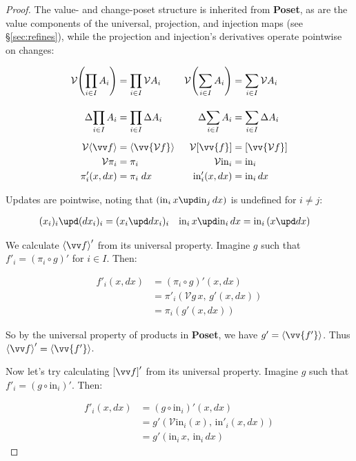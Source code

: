 \documentclass[nomarginums]{rntz}
\newcommand\cat\textbf
\newcommand\Poset{\cat{Poset}}
\newcommand\D\Delta
\newcommand\injc{\mathrm{in}}
\newcommand\inj[1]{\injc_{#1}\,}
\newcommand\vals[1]{#1^v} %
\newcommand\chgs[1]{\D{#1}}
\newcommand\fork[1]{\langle{#1}\rangle}
\newcommand\krof[1]{[{#1}]}
\newcommand\Fork[1]{\left\langle{#1}\right\rangle}
\newcommand\Krof[1]{\left[{#1}\right]}
\renewcommand\fork\Fork
\renewcommand\krof\Krof
\renewcommand\vals{\mathcal{V}}
\newcommand\funct[1]{\vals{#1}}
\newcommand\deriv[1]{#1'}
\begin{document}
\begin{proof}
  The value- and change-poset structure is inherited from \Poset{}, as are the
  value components of the universal, projection, and injection maps (see
  \S\ref{sec:refines}), while the projection and injection's derivatives operate
  pointwise on changes:

  \begin{align*}
    \vals{\left(\prod_{i \in I} A_i\right)} &= \prod_{i \in I} \vals A_i &
    \vals{\left(\sum_{i \in I} A_i\right)} &= \sum_{i \in I} \vals A_i
    \\[1em]
    \chgs{\prod_{i \in I} A_i} &= \prod_{i \in I} \chgs A_i &
    \chgs{\sum_{i \in I} A_i} &= \sum_{i \in I} \chgs A_i
    \\[.5em]
    \funct{\Fork{\vv f}} &= \Fork{\vv{\funct f}} &
    \funct{\Krof{\vv{f}}} &= \Krof{\vv{\funct f}}
    \\
    \funct\pi_i &= \pi_i & \funct \injc_i &= \injc_i
    \\
    \deriv\pi_i(x,dx) &= \pi_i\;dx & \deriv\injc_i(x,dx) &= \inj i dx
  \end{align*}

  \noindent Updates are pointwise, noting that $(\inj i x \upd \inj j dx)$ is
  undefined for $i \ne j$:

  \begin{align*}
    (x_i)_i \upd (dx_i)_i &= (x_i \upd dx_i)_i &
    \inj i x \upd \inj i dx &= \inj i (x \upd dx)
  \end{align*}

  We calculate $\deriv{\fork{\vv f}}$ from its universal property. Imagine $g$
  such that $\deriv f_i = (\pi_i \circ g)'$ for $i \in I$. Then:

  \begin{align*}
    \deriv f_i(x,dx) &= \deriv{(\pi_i \circ g)} (x,dx)\\
    &= \deriv\pi_i(\funct g\,x,\, \deriv g(x,dx))\\
    &= \pi_i (\deriv g(x,dx))
  \end{align*}

  \noindent
  So by the universal property of products in \Poset{}, we have $\deriv g =
  \fork{\vv{\deriv f}}$. Thus $\deriv{\fork{\vv f}} = \fork{\vv{\deriv f}}$.

  Now let's try calculating $\deriv{\krof{\vv f}}$ from its universal property.
  Imagine $g$ such that $\deriv f_i = \deriv{(g \circ \injc_i)}$. Then:

  \begin{align*}
    \deriv f_i(x,dx) &= \deriv{(g \circ \injc_i)}(x,dx)\\
    &= \deriv g(\funct\injc_i(x),\, \deriv\injc_i(x,dx))\\
    &= \deriv g(\inj i x,\, \inj i dx)
  \end{align*}


\end{proof}
\end{document}
